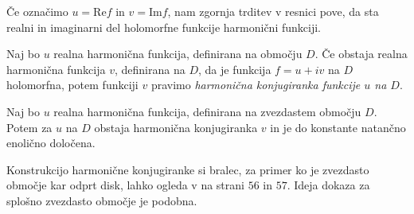 \documentclass[mat1]{fmfdelo}
\begin{document}
    \begin{opomba}
        Če označimo $u = \text{Re}{f}$ in $v = \text{Im}{f}$, nam zgornja trditev v resnici pove, da sta realni in imaginarni del holomorfne funkcije harmonični funkciji. 
    \end{opomba}

    \begin{definicija}
        Naj bo $u$ realna harmonična funkcija, definirana na območju $D$. Če obstaja realna harmonična funkcija $v$, definirana na $D$, da je funkcija $f = u + iv$ na $D$ holomorfna, potem funkciji $v$ pravimo \emph{harmonična konjugiranka funkcije $u$ na $D$}.    
    \end{definicija}

    \begin{trditev}
        \label{konj}
        Naj bo $u$ realna harmonična funkcija, definirana na zvezdastem območju $D$. Potem za $u$ na $D$ obstaja harmonična konjugiranka $v$ in je do konstante natančno enolično določena. 
    \end{trditev}
    \begin{dokaz}
        Konstrukcijo harmonične konjugiranke si bralec, za primer ko je zvezdasto območje kar odprt disk, lahko ogleda v \cite{osnova} na strani $56$ in $57$. 
        Ideja dokaza za splošno zvezdasto območje je podobna. 
    \end{dokaz}
\end{document}
